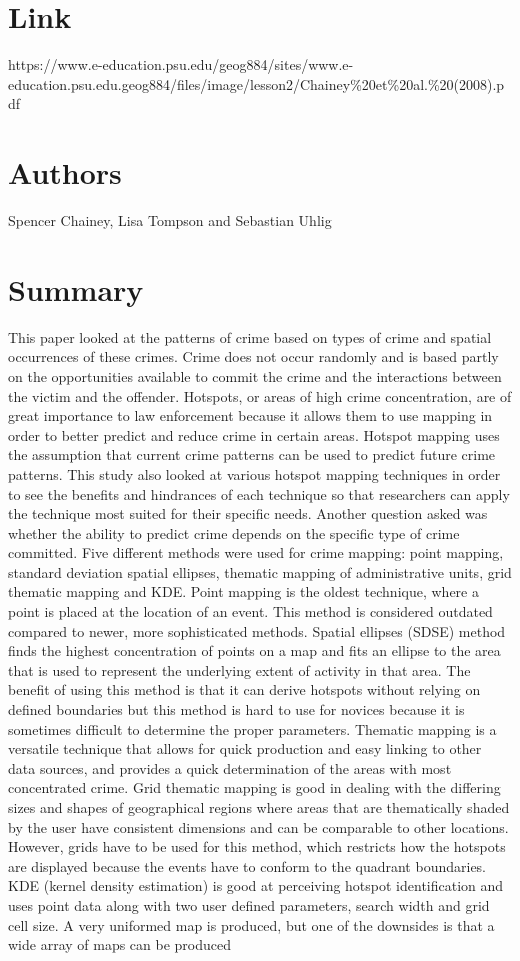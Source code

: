 \documentclass[10pt,letterpaper,english]{article}
\begin{document}
\section*{Link}
https://www.e-education.psu.edu/geog884/sites/www.e-education.psu.edu.geog884/files/image/lesson2/Chainey\%20et\%20al.\%20(2008).pdf

\section*{Authors}
Spencer Chainey, Lisa Tompson and Sebastian Uhlig

\section*{Summary}

This paper looked at the patterns of crime based on types of crime and spatial occurrences of these crimes. Crime does not occur randomly and is based partly on the opportunities available to commit the crime and the interactions between the victim and the offender. Hotspots, or areas of high crime concentration, are of great importance to law enforcement because it allows them to use mapping in order to better predict and reduce crime in certain areas. Hotspot mapping uses the assumption that current crime patterns can be used to predict future crime patterns. This study also looked at various hotspot mapping techniques in order to see the benefits and hindrances of each technique so that researchers can apply the technique most suited for their specific needs. Another question asked was whether the ability to predict crime depends on the specific type of crime committed. Five different methods were used for crime mapping: point mapping, standard deviation spatial ellipses, thematic mapping of administrative units, grid thematic mapping and KDE. Point mapping is the oldest technique, where a point is placed at the location of an event. This method is considered outdated compared to newer, more sophisticated methods. Spatial ellipses (SDSE) method finds the highest concentration of points on a map and fits an ellipse to the area that is used to represent the underlying extent of activity in that area. The benefit of using this method is that it can derive hotspots without relying on defined boundaries but this method is hard to use for novices because it is sometimes difficult to determine the proper parameters. Thematic mapping is a versatile technique that allows for quick production and easy linking to other data sources, and provides a quick determination of the areas with most concentrated crime. Grid thematic mapping is good in dealing with the differing sizes and shapes of geographical regions where areas that are thematically shaded by the user have consistent dimensions and can be comparable to other locations. However, grids have to be used for this method, which restricts how the hotspots are displayed because the events have to conform to the quadrant boundaries. KDE (kernel density estimation) is good at perceiving hotspot identification and uses point data along with two user defined parameters, search width and grid cell size. A very uniformed map is produced, but one of the downsides is that a wide array of maps can be produced 
\end{document}
